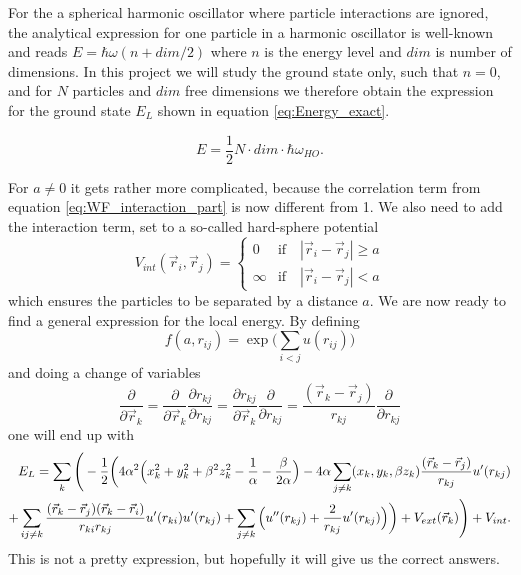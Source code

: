 \documentclass[norsk,a4paper,12pt]{article}
\begin{document}
For the a spherical harmonic oscillator where particle interactions are ignored, the analytical expression for one particle in a harmonic oscillator is well-known and reads $E = \hbar\omega(n + dim/2)$ where $n$ is the energy level and $dim$ is number of dimensions. In this project we will study the ground state only, such that $n=0$, and for $N$ particles and $dim$ free dimensions we therefore obtain the expression for the ground state $E_L$ shown in equation \ref{eq:Energy_exact}.

\begin{equation}
E = \frac{1}{2}N\cdot dim\cdot\hbar\omega_{HO}.
\label{eq:Energy_exact}
\end{equation}


For $a\neq0$ it gets rather more complicated, because the correlation term from equation \ref{eq:WF_interaction_part} is now different from 1. We also need to add the interaction term, set to a so-called hard-sphere potential
\begin{equation}
V_{int}(\vec{r}_i, \vec{r}_j)=
\begin{cases} 
   0 & \text{if}\quad |\vec{r}_i-\vec{r}_j| \geq a \\
   \infty & \text{if}\quad |\vec{r}_i-\vec{r}_j| < a
\end{cases}
\end{equation}
which ensures the particles to be separated by a distance $a$. We are now ready to find a general expression for the local energy. By defining
\begin{equation}
f(a, r_{ij})=\exp{\bigg(\sum_{i<j}u(r_{ij})\bigg)}
\end{equation}
and doing a change of variables
\begin{equation}
\frac{\partial}{\partial \vec{r}_k}=\frac{\partial}{\partial \vec{r}_k}\frac{\partial r_{kj}}{\partial r_{kj}}=\frac{\partial r_{kj}}{\partial \vec{r}_k}\frac{\partial}{\partial r_{kj}}=\frac{(\vec{r}_k-\vec{r}_j)}{r_{kj}}\frac{\partial}{\partial r_{kj}}
\end{equation}
one will end up with
\begin{align}
E_L=\sum_k\Bigg(-\frac{1}{2}\bigg(4\alpha^2\Big(x_k^2+y_k^2+\beta^2z_k^2-\frac{1}{\alpha}-\frac{\beta}{2\alpha}\Big)
-4\alpha\sum_{j\neq k}(x_k, y_k, \beta z_k)\frac{(\vec{r}_k-\vec{r}_j)}{r_{kj}}u'(r_{kj})\notag\\
+\sum_{ij\neq k}\frac{(\vec{r}_k-\vec{r}_j)(\vec{r}_k-\vec{r}_i)}{r_{ki}r_{kj}}u'(r_{ki})u'(r_{kj})
+\sum_{j\neq k}\Big(u''(r_{kj})+\frac{2}{r_{kj}}u'(r_{kj})\Big)\bigg)+V_{ext}(\vec{r}_k)\Bigg) + V_{int}.\notag
\label{EL_total}
\end{align}
This is not a pretty expression, but hopefully it will give us the correct answers. 
\end{document}
